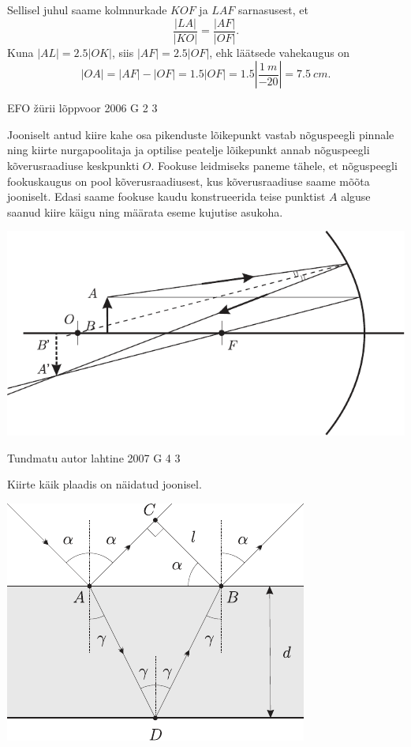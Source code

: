 \documentclass[11pt, twoside]{article}
\begin{document}
{{Sellisel juhul saame kolmnurkade $KOF$ ja $LAF$ sarnasusest, et 
\[
\frac{|LA|}{|KO|}=\frac{|AF|}{|OF|}.
\]
Kuna $|AL| = \num{2.5}|OK|$, siis $|AF| = \num{2.5}|OF|$, ehk läätsede vahekaugus on 
\[
|OA| = |AF| - |OF| = \num{1.5}|OF| = \num{1.5} \left\lvert\frac{\SI{1}{m}}{\num{-20}}\right\rvert = \SI{7.5}{cm}.
\]
\fi
}

{EFO žürii} %
{lõppvoor} %
{2006} %
{G 2} %
{3} %
{

\ifSolution
Jooniselt antud kiire kahe osa pikenduste lõikepunkt vastab nõguspeegli pinnale ning kiirte nurgapoolitaja ja optilise peatelje lõikepunkt annab nõguspeegli kõverusraadiuse keskpunkti $O$. Fookuse leidmiseks paneme tähele, et nõguspeegli fookuskaugus on pool kõverusraadiusest, kus kõverusraadiuse saame mõõta jooniselt. Edasi saame fookuse kaudu konstrueerida teise punktist $A$ alguse saanud kiire käigu ning määrata eseme kujutise asukoha.

\begin{center}
	\includegraphics[width=\linewidth]{2006-v3g-02-lah}
\end{center}
\fi
}

{Tundmatu autor} %
{lahtine} %
{2007} %
{G 4} %
{3} %
{

\ifSolution
Kiirte käik plaadis on näidatud joonisel.

\begin{center}
	\includegraphics[width=0.7\linewidth]{2007-lahg-04-lah}
\end{center}

}}
\end{document}
